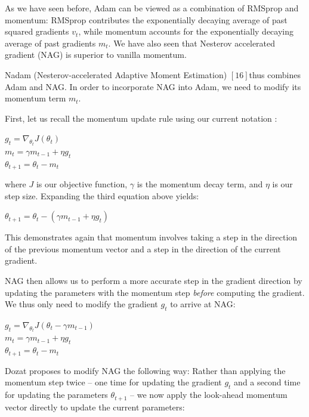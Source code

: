 \documentclass[4pt,journal,compsoc]{IEEEtran}
\begin{document}
\begin{flushleft}
    As we have seen before, Adam can be viewed as a combination of RMSprop and momentum: RMSprop contributes the exponentially decaying average of past squared gradients $v_t$, while momentum accounts for the exponentially decaying average of past gradients $m_t$. We have also seen that Nesterov accelerated gradient (NAG) is superior to vanilla momentum. \newline
    
    Nadam (Nesterov-accelerated Adaptive Moment Estimation) $ {[16]}$thus combines Adam and NAG. In order to incorporate NAG into Adam, we need to modify its momentum term $m_t$. \newline
    
    First, let us recall the momentum update rule using our current notation : \newline

    $g_t = \nabla_{\theta_t}J(\theta_t)$\\
    $m_t = \gamma m_{t-1} + \eta g_t$\\
    $\theta_{t+1} = \theta_t - m_t$ \newline
    
    where $J$ is our objective function, $\gamma$ is the momentum decay term, and $\eta$ is our step size. Expanding the third equation above yields: \newline
    
    $\theta_{t+1} = \theta_t - ( \gamma m_{t-1} + \eta g_t)$ \newline

    This demonstrates again that momentum involves taking a step in the direction of the previous momentum vector and a step in the direction of the current gradient. \newline
    
    NAG then allows us to perform a more accurate step in the gradient direction by updating the parameters with the momentum step \emph{before} computing the gradient. We thus only need to modify the gradient $g_t$ to arrive at NAG: \newline

    $g_t = \nabla_{\theta_t}J(\theta_t - \gamma m_{t-1})$\\
    $m_t = \gamma m_{t-1} + \eta g_t$\\
    $\theta_{t+1} = \theta_t - m_t$ \newline

    
    Dozat proposes to modify NAG the following way: Rather than applying the momentum step twice -- one time for updating the gradient $g_t$ and a second time for updating the parameters $\theta_{t+1}$ -- we now apply the look-ahead momentum vector directly to update the current parameters: \newline
    

\end{flushleft}
\end{document}
